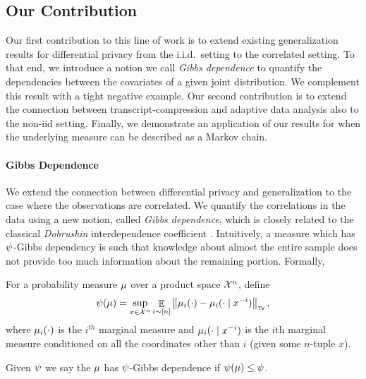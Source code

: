 \documentclass[12pt,a4paper,oneside,onecolumn]{book}
\begin{document}
%
%

\subsection{Our Contribution}

Our first contribution to this line of work is to extend existing generalization results for differential privacy from the i.i.d.\ setting to the correlated setting.
To that end, we introduce
a notion we call \emph{Gibbs dependence} to quantify the  dependencies between 
the covariates of a given joint
distribution. 
We complement this result with a tight negative example. 
Our second contribution is 
to extend the connection between transcript-compression and adaptive data analysis also to the non-iid setting.
Finally, we demonstrate an application of our results for when the underlying measure can be described as a Markov chain.

\paragraph{Gibbs Dependence}
\label{subsec:into-gd-dp}

We extend the connection between differential privacy and generalization to the case where the observations are correlated. We quantify the correlations in the data using a new notion, called \emph{Gibbs dependence}, which is closely related to the classical 
\emph{Dobrushin} interdependence coefficient \citep{kontorovich2017concentration,levin2017markov}.
Intuitively, a measure which has $\psi$-Gibbs dependency
is such that knowledge about almost the entire sample
does not provide too much information about the remaining portion.
Formally, 

\begin{definition}%
  For a probability measure $\mu$
  over a product space $\mathcal{X}^n$,
  define
    \[\psi(\mu)
     = 
     \sup_{x\in\mathcal{X}^n}
     \mathop{\mathbb{E}}_{i\sim[n]}
     \left\lVert\mu_i(\cdot) - \mu_i(\cdot\mid x^{-i})\right\rVert_{\textup{\tiny\textsf{TV}}},
     \]    
  where $\mu_i(\cdot)$ is the $i^{th}$ marginal measure 
  and $\mu_i(\cdot\mid x^{-i})$ is the $i${th} marginal measure
  conditioned on all the coordinates other than $i$
  (given some $n$-tuple $x$).

  Given $\psi$
  we say the $\mu$ has $\psi$-Gibbs dependence
  if $\psi(\mu) \leq \psi$. 
\end{definition}
\end{document}
